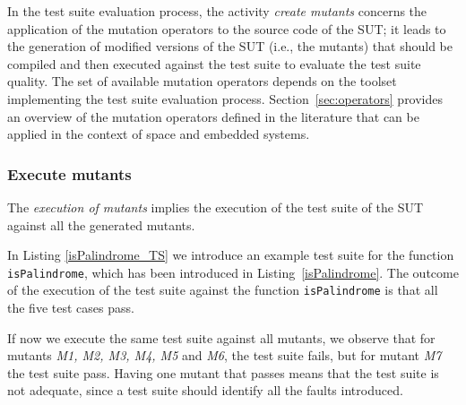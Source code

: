 
In the test suite evaluation process, the activity \emph{create mutants} concerns the application of the mutation operators to the source code of the SUT; it leads to the generation of modified versions of the SUT (i.e., the mutants) that should be compiled and then executed against the test suite to evaluate the test suite quality. 
The set of available mutation operators depends on the toolset implementing the test suite evaluation process.
Section~\ref{sec:operators} provides an overview of the mutation operators defined in the literature that can be applied in the context of space and embedded systems.

\subsubsection{Execute mutants}


The \emph{execution of mutants} implies the execution of the test suite of the SUT against all the generated mutants. 





In Listing \ref{isPalindrome_TS} we introduce an example test suite for the function \texttt{isPalindrome}, which has been introduced in Listing~\ref{isPalindrome}. 
The outcome of the execution of the test suite against the function \texttt{isPalindrome} is that all the five test cases pass.

If now we execute the same test suite against all mutants, we observe that for mutants \textit{M1, M2, M3, M4, M5} and \textit{M6}, the test suite fails, but for mutant \textit{M7} the test suite pass. Having one mutant that passes means that the test suite is not adequate, since a test suite should identify all the faults introduced.

